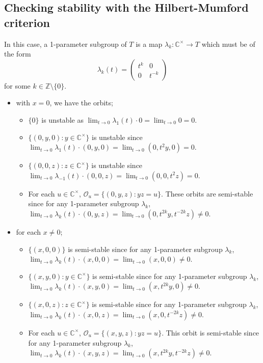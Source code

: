 \documentclass[12pt]{amsart}
\newcommand{\C}{\mathbb{C}}
\theoremstyle{remark}
\theoremstyle{remark}
\begin{document}
\subsection*{Checking stability with the Hilbert-Mumford criterion}
In this case, a 1-parameter subgroup of $T$ is a map $\lambda_k : \C^\times \to T$ which must be of the form
$$\lambda_k(t) = \begin{pmatrix} t^k & 0 \\ 0 & t^{-k} \end{pmatrix}$$
for some $k \in \mathbb{Z}\setminus \{0\}$.
\begin{itemize}[label=--]
\item with $x = 0$, we have the orbits;
	\begin{itemize}
	\item $\{0\}$ is unstable as $\lim_{t\to 0} \lambda_1(t) \cdot 0 = \lim_{t \to 0} 0 = 0$.
	\item $\{(0, y, 0) : y \in \C^\times\}$ is unstable since $\lim_{t \to 0} \lambda_1(t) \cdot (0, y, 0) = \lim_{t \to 0} (0, t^2 y, 0) = 0$.
	\item $\{(0, 0, z) : z \in \C^\times\}$ is unstable since $\lim_{t \to 0} \lambda_{-1}(t) \cdot (0, 0, z) = \lim_{t \to 0} (0, 0, t^2 z) = 0$.
	\item For each $u\in \C^\times$, $\mathcal{O}_u = \{(0, y, z) : yz = u\}$. These orbits are semi-stable since for any 1-parameter subgroup $\lambda_k$, $\lim_{t \to 0} \lambda_k(t) \cdot (0, y, z) = \lim_{t \to 0} (0, t^{2k} y, t^{-2k} z) \ne 0$.
	\end{itemize}
\item for each $x \ne 0$;
	\begin{itemize}
	\item $\{(x, 0, 0)\}$ is semi-stable since for any 1-parameter subgroup $\lambda_k$, $\lim_{t \to 0} \lambda_k(t) \cdot (x, 0, 0) = \lim_{t \to 0} (x, 0, 0) \ne 0$.
	\item $\{(x, y, 0) : y \in \C^\times\}$ is semi-stable since for any 1-parameter subgroup $\lambda_k$, $\lim_{t \to 0} \lambda_k(t) \cdot (x, y, 0) = \lim_{t \to 0} (x, t^{2k} y, 0) \ne 0$.
	\item $\{(x, 0, z) : z \in \C^\times\}$ is semi-stable since for any 1-parameter subgroup $\lambda_k$, $\lim_{t \to 0} \lambda_k(t) \cdot (x, 0, z) = \lim_{t \to 0} (x, 0, t^{-2k} z) \ne 0$.
	\item For each $u\in \C^\times$, $\mathcal{O}_u = \{(x, y, z) : yz = u\}$.
	This orbit is semi-stable since for any 1-parameter subgroup $\lambda_k$, $\lim_{t \to 0} \lambda_k(t) \cdot (x, y, z) = \lim_{t \to 0} (x, t^{2k} y, t^{-2k} z) \ne 0$.
	\end{itemize}
\end{itemize}
\end{document}
